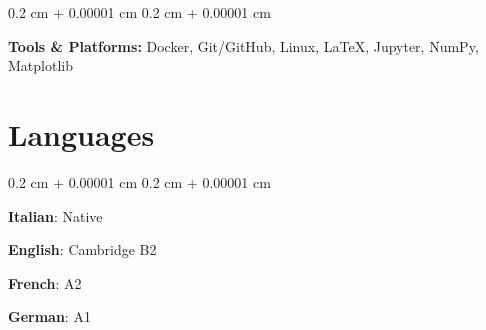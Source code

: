 \documentclass[10pt, letterpaper]{article}
\newenvironment{onecolentry}{
    \begin{adjustwidth}{
        0.2 cm + 0.00001 cm
    }{
        0.2 cm + 0.00001 cm
    }
}{
    \end{adjustwidth}
} %
\begin{document}


\begin{onecolentry}
    \textbf{Tools \& Platforms:} Docker, Git/GitHub, Linux, LaTeX, Jupyter, NumPy, Matplotlib
\end{onecolentry}


\section{Languages}

\begin{onecolentry}
    \textbf{Italian}: Native
    
    \textbf{English}: Cambridge B2

    \textbf{French}: A2

    \textbf{German}: A1
\end{onecolentry}
\end{document}
